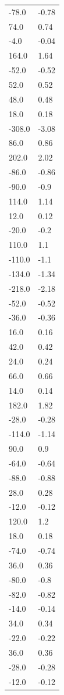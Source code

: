 \begin{longtable}{ll}
-78.0 & -0.78 \\
74.0 & 0.74 \\
-4.0 & -0.04 \\
164.0 & 1.64 \\
-52.0 & -0.52 \\
52.0 & 0.52 \\
48.0 & 0.48 \\
18.0 & 0.18 \\
-308.0 & -3.08 \\
86.0 & 0.86 \\
202.0 & 2.02 \\
-86.0 & -0.86 \\
-90.0 & -0.9 \\
114.0 & 1.14 \\
12.0 & 0.12 \\
-20.0 & -0.2 \\
110.0 & 1.1 \\
-110.0 & -1.1 \\
-134.0 & -1.34 \\
-218.0 & -2.18 \\
-52.0 & -0.52 \\
-36.0 & -0.36 \\
16.0 & 0.16 \\
42.0 & 0.42 \\
24.0 & 0.24 \\
66.0 & 0.66 \\
14.0 & 0.14 \\
182.0 & 1.82 \\
-28.0 & -0.28 \\
-114.0 & -1.14 \\
90.0 & 0.9 \\
-64.0 & -0.64 \\
-88.0 & -0.88 \\
28.0 & 0.28 \\
-12.0 & -0.12 \\
120.0 & 1.2 \\
18.0 & 0.18 \\
-74.0 & -0.74 \\
36.0 & 0.36 \\
-80.0 & -0.8 \\
-82.0 & -0.82 \\
-14.0 & -0.14 \\
34.0 & 0.34 \\
-22.0 & -0.22 \\
36.0 & 0.36 \\
-28.0 & -0.28 \\
-12.0 & -0.12 \\

\end{longtable}
